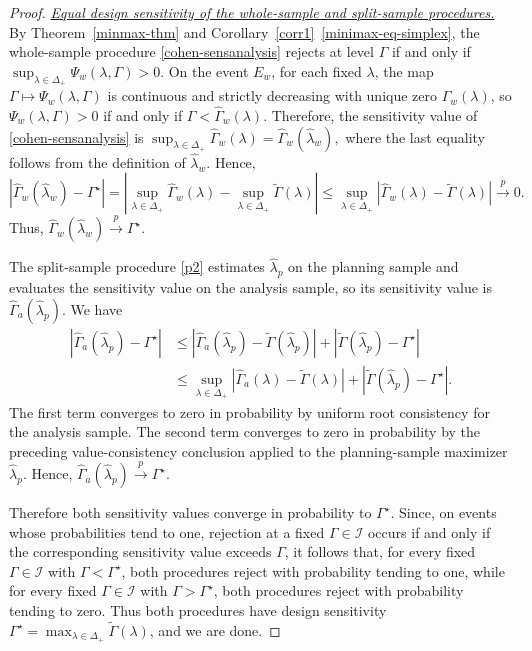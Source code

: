 \documentclass[12pt,leqno,titlepage]{amsart}
\newcommand{\DeltaP}{\Delta_+}
\newcommand{\Ical}{\mathcal I}
\newcommand{\1}{\mathbbm{1}}
\begin{document}
\begin{bibunit}
{\begin{proof}
\medskip

\noindent\textit{\underline{Equal design sensitivity of the whole-sample and split-sample procedures.}} By Theorem~\ref{minmax-thm} and Corollary~\ref{corr1}~\ref{minimax-eq-simplex}, the whole-sample procedure \eqref{cohen-sensanalysis} rejects at level $\Gamma$ if and only if $\sup_{\lambda\in\Delta_+}\Psi_w(\lambda,\Gamma)>0$. On the event $E_w$, for each fixed $\lambda$, the map $\Gamma\mapsto\Psi_w(\lambda,\Gamma)$ is continuous and strictly decreasing with unique zero $\widehat\Gamma_w(\lambda)$, so $\Psi_w(\lambda,\Gamma)>0$ if and only if $\Gamma<\widehat\Gamma_w(\lambda)$. Therefore, the sensitivity value of \eqref{cohen-sensanalysis} is
$
\sup_{\lambda\in\Delta_+}\widehat\Gamma_w(\lambda)
=
\widehat\Gamma_w(\widehat\lambda_w),
$
where the last equality follows from the definition of $\widehat\lambda_w$. Hence,
\[
\left|
\widehat\Gamma_w(\widehat\lambda_w)-\Gamma^\star
\right|
=
\left|
\sup_{\lambda\in\DeltaP}\widehat\Gamma_w(\lambda)
-
\sup_{\lambda\in\DeltaP}\widetilde\Gamma(\lambda)
\right|
\le
\sup_{\lambda\in\DeltaP}
\left|\widehat\Gamma_w(\lambda)-\widetilde\Gamma(\lambda)\right|
\xrightarrow{p}0.
\]
Thus, 
$
\widehat\Gamma_w(\widehat\lambda_w)
\xrightarrow{p}
\Gamma^\star.
$

The split-sample procedure \eqref{p2} estimates \(\widehat\lambda_p\) on the planning sample and evaluates the sensitivity value on the analysis sample, so its sensitivity value is \(\widehat\Gamma_a(\widehat\lambda_p)\). We have
\begin{align*}
\left|
\widehat\Gamma_a(\widehat\lambda_p)-\Gamma^\star
\right|
&\le
\left|
\widehat\Gamma_a(\widehat\lambda_p)-\widetilde\Gamma(\widehat\lambda_p)
\right|
+
\left|
\widetilde\Gamma(\widehat\lambda_p)-\Gamma^\star
\right| \\
&\le
\sup_{\lambda\in\DeltaP}
\left|\widehat\Gamma_a(\lambda)-\widetilde\Gamma(\lambda)\right|
+
\left|
\widetilde\Gamma(\widehat\lambda_p)-\Gamma^\star
\right|.
\end{align*}
The first term converges to zero in probability by uniform root consistency for the analysis sample. The second term converges to zero in probability by the preceding value-consistency conclusion applied to the planning-sample maximizer \(\widehat\lambda_p\). Hence,
$
\widehat\Gamma_a(\widehat\lambda_p)
\xrightarrow{p}
\Gamma^\star.
$

Therefore both sensitivity values converge in probability to \(\Gamma^\star\). Since, on events whose probabilities tend to one, rejection at a fixed \(\Gamma\in\Ical\) occurs if and only if the corresponding sensitivity value exceeds \(\Gamma\), it follows that, for every fixed \(\Gamma\in\mathcal I\) with
\(\Gamma<\Gamma^\star\), both procedures reject with probability tending to one,
while for every fixed \(\Gamma\in\mathcal I\) with
\(\Gamma>\Gamma^\star\), both procedures reject with probability tending to zero. Thus both procedures have design sensitivity
$
\Gamma^\star
=
\max_{\lambda\in\DeltaP}\widetilde\Gamma(\lambda)
$, and we are done.
\end{proof}

}
\end{bibunit}
\end{document}
